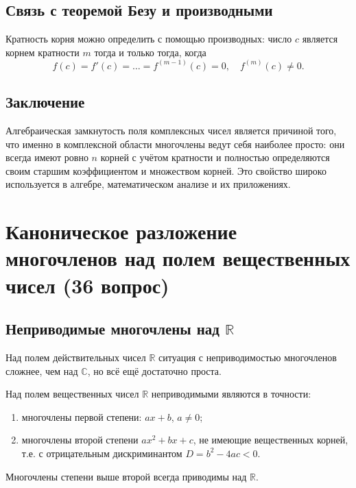 \documentclass[a4paper,12pt]{article}
\theoremstyle{definition}
\theoremstyle{plain}
\theoremstyle{remark}
\begin{document}
	\subsection{Связь с теоремой Безу и производными}
	
	Кратность корня можно определить с помощью производных: число \( c \) является корнем кратности \( m \) тогда и только тогда, когда
	\[
	f(c) = f'(c) = \dots = f^{(m-1)}(c) = 0, \quad f^{(m)}(c) \neq 0.
	\]
	
	\subsection{Заключение}
	
	Алгебраическая замкнутость поля комплексных чисел является причиной того, что именно в комплексной области многочлены ведут себя наиболее просто: они всегда имеют ровно \( n \) корней с учётом кратности и полностью определяются своим старшим коэффициентом и множеством корней. Это свойство широко используется в алгебре, математическом анализе и их приложениях.
	
	
	
	
	
	\newpage
	\section{Каноническое разложение многочленов над полем вещественных чисел (36 вопрос)}
	
	\subsection{Неприводимые многочлены над \(\mathbb{R}\)}
	
	Над полем действительных чисел \(\mathbb{R}\) ситуация с неприводимостью многочленов сложнее, чем над \(\mathbb{C}\), но всё ещё достаточно проста.
	
	\begin{tcolorbox}[colback=blue!5, colframe=blue!40!black, title=Предложение (Неприводимые многочлены над \(\mathbb{R}\))]
		Над полем вещественных чисел \(\mathbb{R}\) неприводимыми являются в точности:
		\begin{enumerate}
			\item многочлены первой степени: \(ax + b\), \(a \neq 0\);
			\item многочлены второй степени \(ax^2 + bx + c\), не имеющие вещественных корней, т.е. с отрицательным дискриминантом \(D = b^2 - 4ac < 0\).
		\end{enumerate}
		Многочлены степени выше второй всегда приводимы над \(\mathbb{R}\).
	\end{tcolorbox}
	
\end{document}
